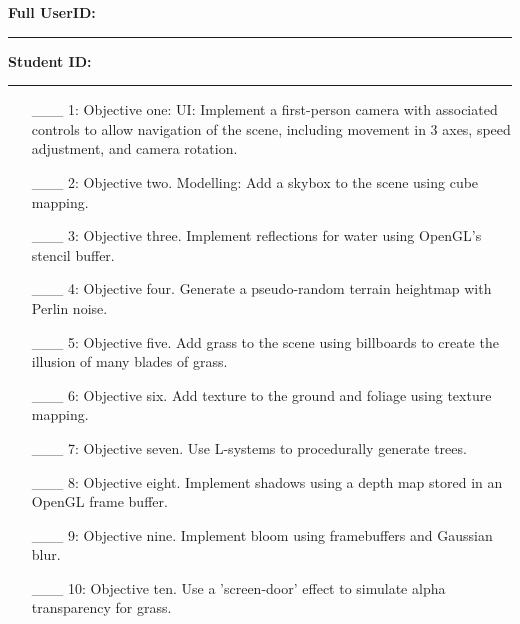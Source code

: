 \documentclass {article}
\begin{document}

{\hfill{\bf Full UserID:\rule{2in}{.1mm}}\hfill{\bf Student ID:\rule{2in}{.1mm}}\hfill}

\begin{enumerate}
     \item[\_\_\_ 1:]  Objective one: UI: Implement a first-person camera with associated controls to allow navigation of the scene, including movement in 3 axes, speed adjustment, and camera rotation.

     \item[\_\_\_ 2:]  Objective two. Modelling: Add a skybox to the scene using cube mapping.

     \item[\_\_\_ 3:]  Objective three. Implement reflections for water using OpenGL's stencil buffer.

     \item[\_\_\_ 4:]  Objective four. Generate a pseudo-random terrain heightmap with Perlin noise.

     \item[\_\_\_ 5:]  Objective five. Add grass to the scene using billboards to create the illusion of many blades of grass.

     \item[\_\_\_ 6:]  Objective six. Add texture to the ground and foliage using texture mapping.

     \item[\_\_\_ 7:]  Objective seven. Use L-systems to procedurally generate trees.

     \item[\_\_\_ 8:]  Objective eight. Implement shadows using a depth map stored in an OpenGL frame buffer.

     \item[\_\_\_ 9:]  Objective nine. Implement bloom using framebuffers and Gaussian blur.

     \item[\_\_\_ 10:]  Objective ten. Use a 'screen-door' effect to simulate alpha transparency for grass.
\end{enumerate}
\end{document}
